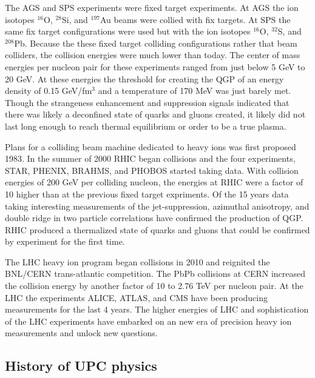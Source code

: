       The AGS and SPS experiments were fixed target experiments.
      At AGS the ion isotopes $^{16}$O, $^{28}$Si, and $^{197}$Au beams were 
        collied with fix targets. 
      At SPS the same fix target configurations were used but with the ion 
        isotopes $^{16}$O, $^{32}$S, and $^{208}$Pb.
      Because the these fixed target colliding configurations rather that beam
        colliders, the collision energies were much lower than today.
      The center of mass energies per nucleon pair for these experiments ranged
        from just below 5 GeV to 20 GeV. 
      At these energies the threshold for creating the QGP of an energy density 
        of 0.15 GeV/fm$^{3}$ and a temperature of 170 MeV was just barely 
        met.
      Though the strangeness enhancement and \JPsi{} suppression 
        signals indicated that there was likely a deconfined state of quarks 
        and gluons created, it likely did not last long enough to reach thermal
        equilibrium or order to be a true plasma. 

      Plans for a colliding beam machine dedicated to heavy ions was first 
        proposed 1983.  
      In the summer of 2000 RHIC began collisions and the four experiments,
        STAR, PHENIX, BRAHMS, and PHOBOS started taking data. 
      With collision energies of 200 GeV per colliding nucleon, the energies 
        at RHIC were a factor of 10 higher than at the previous fixed target 
        expriments. 
      Of the 15 years data taking interesting measurements of the 
        jet-suppression, azimuthal anisotropy, and double ridge in two particle
        correlations have confirmed the production of QGP.
      RHIC produced a thermalized state of quarks and gluons that could be 
        confirmed by experiment for the first time. 
      
      The LHC heavy ion program began collisions in 2010 and reignited the 
        BNL/CERN trans-atlantic competition. 
      The PbPb collisions at CERN increased the collision energy by another 
        factor of 10 to 2.76 TeV per nucleon pair. 
      At the LHC the experiments ALICE, ATLAS, and CMS have been producing 
        measurements for the last 4 years. 
      The higher energies of LHC and sophistication of the LHC experiments have
        embarked on an new era of precision heavy ion measurements and unlock
        new questions.

    \subsection{History of UPC physics}
      



